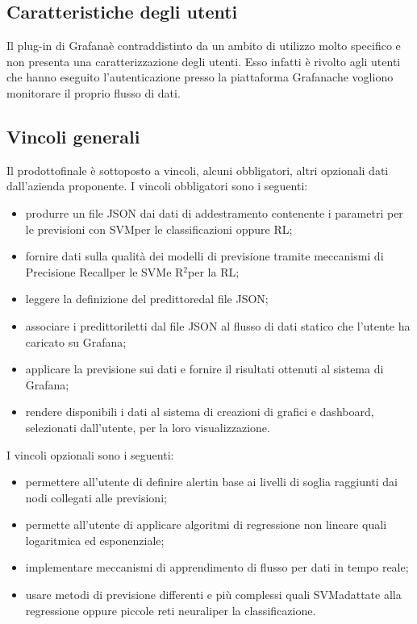 	\subsection{Caratteristiche degli utenti}
	Il plug-in di Grafana\glosp è contraddistinto da un ambito di utilizzo molto specifico e non presenta una caratterizzazione degli utenti. Esso infatti è rivolto agli utenti che hanno eseguito l'autenticazione presso la piattaforma Grafana\glosp che vogliono monitorare il proprio flusso di dati.
	\subsection{Vincoli generali}
	Il prodotto\glosp finale è sottoposto a vincoli, alcuni obbligatori, altri opzionali dati dall'azienda proponente.
	I vincoli obbligatori sono i seguenti:
	\begin{itemize}
		\item produrre un file JSON dai dati di addestramento contenente i parametri per le previsioni con SVM\glosp per le classificazioni oppure RL\glo;
		\item fornire dati sulla qualità dei modelli di previsione tramite meccanismi di Precision\glosp e Recall\glosp per le SVM\glosp e R$^{2}$\glosp per la RL\glo;
		\item leggere la definizione del predittore\glosp dal file JSON;
		\item associare i predittori\glosp letti dal file JSON al flusso di dati statico che l'utente ha caricato su Grafana\glo;
		\item applicare la previsione sui dati e fornire il risultati ottenuti al sistema di Grafana\glo;
		\item rendere disponibili i dati al sistema di creazioni di grafici e dashboard\glo, selezionati dall'utente, per la loro visualizzazione.
	\end{itemize}
	I vincoli opzionali sono i seguenti:
	\begin{itemize}
		\item permettere all'utente di definire alert\glosp in base ai livelli di soglia raggiunti dai nodi collegati alle previsioni;
		\item permette all'utente di applicare algoritmi di regressione non lineare quali logaritmica ed esponenziale;
		\item implementare meccanismi di apprendimento di flusso per dati in tempo reale;
		\item usare metodi di previsione differenti e più complessi quali SVM\glosp adattate alla regressione oppure piccole reti neurali\glosp per la classificazione.
	\end{itemize}
